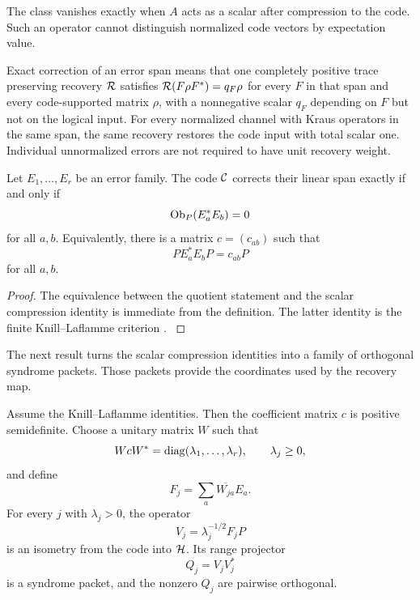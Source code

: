 The class vanishes exactly when \(A\) acts as a scalar after compression to the code. Such an operator cannot distinguish normalized code vectors by expectation value.

Exact correction of an error span means that one completely positive trace preserving recovery $\Rcal$ satisfies $\Rcal(F\rho F^*)=q_F\rho$ for every $F$ in that span and every code-supported matrix $\rho$, with a nonnegative scalar $q_F$ depending on $F$ but not on the logical input. For every normalized channel with Kraus operators in the same span, the same recovery restores the code input with total scalar one. Individual unnormalized errors are not required to have unit recovery weight.

\begin{theorem}\label{strong:theorem:026}\label{strong:thm:kl_obstruction}
Let \(E_1,\ldots,E_r\) be an error family. The code \(\Ccal\) corrects their linear span exactly if and only if
\[
\operatorname{Ob}_P(E_a^*E_b)=0
\]
for all \(a,b\). Equivalently, there is a matrix \(c=(c_{ab})\) such that
\[
PE_a^*E_bP=c_{ab}P
\]
for all \(a,b\).
\end{theorem}

\begin{proof}\label{strong:proof:039}
The equivalence between the quotient statement and the scalar compression identity is immediate from the definition. The latter identity is the finite Knill--Laflamme criterion \cite{KnillLaflamme1997,SchumacherNielsen1996}.
\label{strong:proof:039:end}\end{proof}

The next result turns the scalar compression identities into a family of orthogonal syndrome packets. Those packets provide the coordinates used by the recovery map.

\begin{theorem}\label{strong:theorem:027}\label{strong:thm:syndrome_construction}
Assume the Knill--Laflamme identities. Then the coefficient matrix \(c\) is positive semidefinite. Choose a unitary matrix \(W\) such that
\[
WcW^*=\operatorname{diag}(\lambda_1,\ldots,\lambda_r),
\qquad
\lambda_j\geq0,
\]
and define
\[
F_j=\sum_a\overline{W_{ja}}E_a.
\]
For every \(j\) with \(\lambda_j>0\), the operator
\[
V_j=\lambda_j^{-1/2}F_jP
\]
is an isometry from the code into \(\Hcal\). Its range projector
\[
Q_j=V_jV_j^*
\]
is a syndrome packet, and the nonzero \(Q_j\) are pairwise orthogonal.
\end{theorem}

